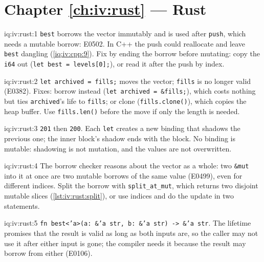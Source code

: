 \section*{Chapter \ref{ch:iv:rust} --- Rust}

\begin{solution}{iq:iv:rust:1}
\texttt{best} borrows the vector immutably and is used after \texttt{push}, which needs a mutable borrow: E0502. In C++ the push
could reallocate and leave \texttt{best} dangling (\cref{iq:iv:cpp:9}). Fix by ending the borrow before mutating: copy the
\texttt{i64} out (\texttt{let best = levels[0];}), or read it after the push by index.
\label{lst:iv:rust:push}
\end{solution}

\begin{solution}{iq:iv:rust:2}
\texttt{let archived = fills;} moves the vector; \texttt{fills} is no longer valid (E0382). Fixes: borrow instead (\texttt{let archived =
\&fills;}), which costs nothing but ties \texttt{archived}'s life to \texttt{fills}; or clone (\texttt{fills.clone()}), which copies the
heap buffer. Use \texttt{fills.len()} before the move if only the length is needed.
\end{solution}

\begin{solution}{iq:iv:rust:3}
\texttt{201} then \texttt{200}. Each \texttt{let} creates a new binding that shadows the previous one; the inner block's shadow ends with
the block. No binding is mutable: shadowing is not mutation, and the values are not overwritten.
\end{solution}

\begin{solution}{iq:iv:rust:4}
The borrow checker reasons about the vector as a whole: two \texttt{\&mut} into it at once are two mutable borrows of the same
value (E0499), even for different indices. Split the borrow with \texttt{split\_at\_mut}, which returns two disjoint mutable slices
(\cref{lst:iv:rust:split}), or use indices and do the update in two statements.
\end{solution}

\begin{solution}{iq:iv:rust:5}
\texttt{fn best<'a>(a: \&'a str, b: \&'a str) -> \&'a str}. The lifetime promises that the result is valid as long as both inputs
are, so the caller may not use it after either input is gone; the compiler needs it because the result may borrow from either
(E0106).
\end{solution}

